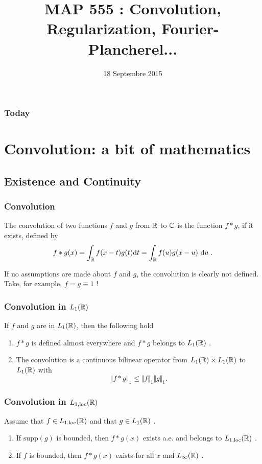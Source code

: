 

\title{MAP 555 : Convolution, Regularization, Fourier-Plancherel...}

\date{18 Septembre 2015}
\maketitle



\begin{frame}
\frametitle{Today}
\tableofcontents
\end{frame}

\section{Convolution: a bit of mathematics}
\subsection{Existence and Continuity}
\begin{frame}
\frametitle{Convolution}
\begin{definition}
The convolution of two functions $f$ and $g$ from $\mathbb{R}$ to $\mathbb{C}$ is the function $f*g$, if it exists, defined by
$$
f*g(x)=\int_{\mathbb{R}}f(x-t)g(t) \mathrm{d} t=\int_{\mathbb{R}}f(u)g(x-u)\ \mathrm{d} u \;.
$$
\end{definition}
If no assumptions are made about $f$ and $g$, the convolution is clearly not defined. Take, for example, $f=g \equiv 1$ !
\end{frame}

\begin{frame}
\frametitle{Convolution in $L_1(\mathbb{R})$}
\begin{theorem}
If $f$ and $g$ are in $L_1(\mathbb{R})$,  then the following hold
\begin{enumerate}[label=(\roman*)]
\item $f*g$ is  defined almost everywhere and $f*g$  belongs to $L_1(\mathbb{R})$ .
\item The convolution is a  continuous bilinear operator from $L_1(\mathbb{R}) \times L_1(\mathbb{R})$  to $L_1(\mathbb{R})$  with
$$
\Vert f*g\Vert_{1}\leq\Vert f\Vert_{1}\Vert g\Vert_{1}.
$$
\end{enumerate}
\end{theorem}
\end{frame}

\begin{frame}
\frametitle{Convolution in $L_{1,\mathrm{loc}}(\mathbb{R})$}
\begin{theorem}
Assume that $f\in L_{1,\mathrm{loc}}(\mathbb{R})$ and that $ g\in L_1(\mathbb{R})$ .
\begin{enumerate}[label=(\roman*)]
\item If $\mathrm{supp}(g)$ is bounded,  then $f*g(x)$ exists a.e. and belongs to $L_{1,\mathrm{loc}}(\mathbb{R})$ .
\item If $f$  is bounded,  then $f*g(x)$ exists for all $x$ and  $L_\infty(\mathbb{R})$ .
\end{enumerate}
\end{theorem}
\end{frame}

